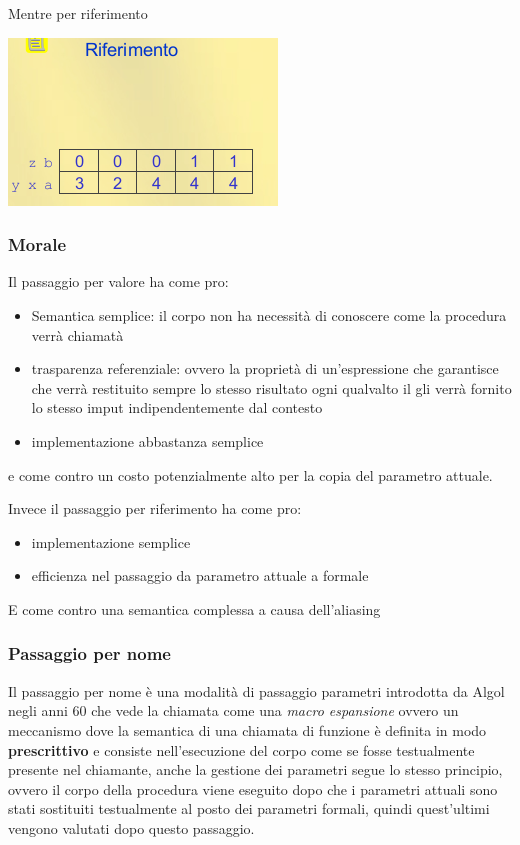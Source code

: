 Mentre per riferimento
\begin{center}
    \includegraphics{img/riferimento.png}
\end{center}



\subsubsection{Morale}
Il passaggio per valore ha come pro:
\begin{itemize}
    \item Semantica semplice: il corpo non ha necessità di conoscere come la procedura verrà chiamatà
    \item trasparenza referenziale: ovvero la proprietà di un'espressione che garantisce che verrà restituito sempre lo stesso risultato ogni qualvalto il gli verrà fornito lo stesso imput indipendentemente dal contesto
    \item implementazione abbastanza semplice
\end{itemize}
e come contro un costo potenzialmente alto per la copia del parametro attuale.

Invece il passaggio per riferimento ha come pro:
\begin{itemize}
    \item implementazione semplice
    \item efficienza nel passaggio da parametro attuale a formale
\end{itemize}

E come contro una semantica complessa a causa dell'aliasing
\subsubsection{Passaggio per nome}

Il passaggio per nome è una modalità di passaggio parametri introdotta da Algol negli anni 60 che vede la chiamata come una \textit{macro espansione} ovvero un meccanismo dove la semantica di una chiamata di funzione è definita in modo \textbf{prescrittivo} e consiste nell'esecuzione del corpo come se fosse testualmente presente nel chiamante, anche la gestione dei parametri segue lo stesso principio, ovvero il corpo della procedura viene eseguito dopo che i parametri attuali sono stati sostituiti testualmente al posto dei parametri formali, quindi quest'ultimi vengono valutati dopo questo passaggio. 

